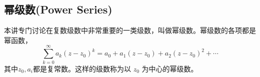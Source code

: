 \subsection{幂级数(Power Series)}
本讲专门讨论在复数级数中非常重要的一类级数，叫做幂级数。幂级数的各项都是幂函数，
\begin{equation}
    \sum_{k=0}^{\infty} a_k\left(z-z_0\right)^k=a_0+a_1\left(z-z_0\right)+a_2\left(z-z_0\right)^2+\cdots
\end{equation}
其中$z_0, a_i$都是复常数。这样的级数称为以 $z_0$ 为中心的幂级数。